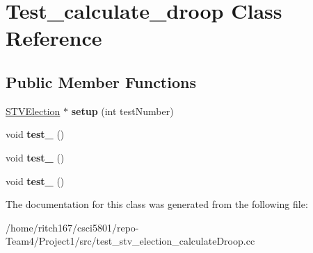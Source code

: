 \hypertarget{classTest__calculate__droop}{}\section{Test\+\_\+calculate\+\_\+droop Class Reference}
\label{classTest__calculate__droop}
\subsection*{Public Member Functions}
\begin{DoxyCompactItemize}
\item 
\mbox{\label{classTest__calculate__droop_ab4dab12e133e0a45fb2e359149c76777}} 
\hyperlink{classSTVElection}{S\+T\+V\+Election} $\ast$ {\bfseries setup} (int test\+Number)
\item 
\mbox{\label{classTest__calculate__droop_a83c523ab9d6fc29ccd9ee2c4b90baf87}} 
void {\bfseries test\+\_} ()
\item 
\mbox{\label{classTest__calculate__droop_abe6d5c984406f73d54daa283598a0a2d}} 
void {\bfseries test\+\_} ()
\item 
\mbox{\label{classTest__calculate__droop_a8d5abf37065a1e776e507cea4396abe6}} 
void {\bfseries test\+\_} ()
\end{DoxyCompactItemize}


The documentation for this class was generated from the following file\+:\begin{DoxyCompactItemize}
\item 
/home/ritch167/csci5801/repo-\/\+Team4/\+Project1/src/test\+\_\+stv\+\_\+election\+\_\+calculate\+Droop.\+cc\end{DoxyCompactItemize}
